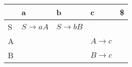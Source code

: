 \documentclass{standalone}
\providecommand\lightrule{%
	\arrayrulecolor{black!30}%
	\midrule[\lightrulewidth]%
	\arrayrulecolor{black}}
\begin{document}
\begin{tabularx}{\textwidth}{XXXXX}
     & a & b & c & \$ \\
    \midrule
        S
        &
        \(S \rightarrow aA\)
        &
        \(S \rightarrow bB\)
        &
        
        &
        \\ \lightrule
        A
        &
        
        &
        
        &
        \(A \rightarrow c\)
        &
        \\ \lightrule
        B
        &
        
        &
        
        &
        \(B \rightarrow c\)
        &
\end{tabularx}
\end{document}
